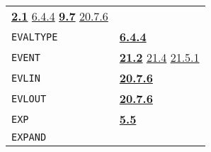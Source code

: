\documentclass[a4paper]{scrbook}
\begin{document}
\begin{longtable}[]{@{}ll@{}}
\begin{minipage}[t]{0.70\columnwidth}
\textbf{\href{02-read-evaluate-print.md\#21-general-1}{2.1}}
\href{06-data-types.md\#644-printtype-evaltype-and-applytype}{6.4.4} \textbf{\href{09-functions.md\#97-eval-and-bind}{9.7}}
\href{20-coroutines.md\#2076-1step}{20.7.6}\strut
\end{minipage}\tabularnewline
\begin{minipage}[t]{0.24\columnwidth}\raggedright\strut
\texttt{EVALTYPE}\strut
\end{minipage} & \begin{minipage}[t]{0.70\columnwidth}\raggedright\strut
\textbf{\href{06-data-types.md\#644-printtype-evaltype-and-applytype}{6.4.4}}\strut
\end{minipage}\tabularnewline
\begin{minipage}[t]{0.24\columnwidth}\raggedright\strut
\texttt{EVENT}\strut
\end{minipage} & \begin{minipage}[t]{0.70\columnwidth}\raggedright\strut
\textbf{\href{21-interrupts.md\#212-event}{21.2}} \href{21-interrupts.md\#214-off}{21.4}
\href{21-interrupts.md\#2151-iheader}{21.5.1}\strut
\end{minipage}\tabularnewline
\begin{minipage}[t]{0.24\columnwidth}\raggedright\strut
\texttt{EVLIN}\strut
\end{minipage} & \begin{minipage}[t]{0.70\columnwidth}\raggedright\strut
\textbf{\href{20-coroutines.md\#2076-1step}{20.7.6}}\strut
\end{minipage}\tabularnewline
\begin{minipage}[t]{0.24\columnwidth}\raggedright\strut
\texttt{EVLOUT}\strut
\end{minipage} & \begin{minipage}[t]{0.70\columnwidth}\raggedright\strut
\textbf{\href{20-coroutines.md\#2076-1step}{20.7.6}}\strut
\end{minipage}\tabularnewline
\begin{minipage}[t]{0.24\columnwidth}\raggedright\strut
\texttt{EXP}\strut
\end{minipage} & \begin{minipage}[t]{0.70\columnwidth}\raggedright\strut
\textbf{\href{05-simple-functions.md\#55-examples-comments-1}{5.5}}\strut
\end{minipage}\tabularnewline
\begin{minipage}[t]{0.24\columnwidth}\raggedright\strut
\texttt{EXPAND}\strut
\end{minipage} & \begin{minipage}[t]{0.70\columnwidth}\raggedright\strut

\end{minipage}
\end{longtable}
\end{document}
